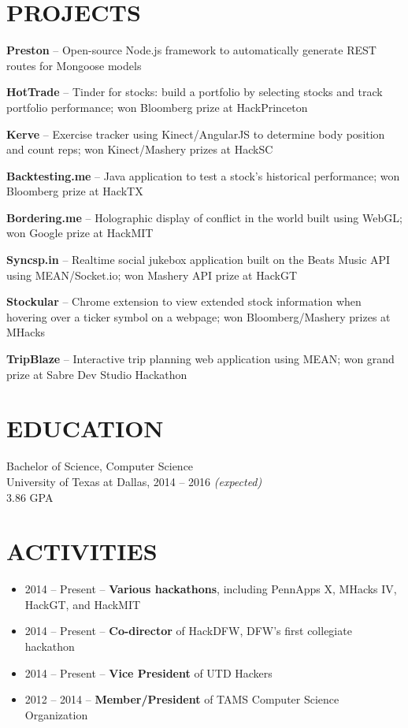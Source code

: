 \documentclass{res} %
\begin{document}
\section{PROJECTS}

\textbf{Preston} -- Open-source Node.js framework to automatically generate REST routes for Mongoose models

\textbf{HotTrade} -- Tinder for stocks: build a portfolio by selecting stocks and track portfolio performance; won Bloomberg prize at HackPrinceton

\textbf{Kerve} -- Exercise tracker using Kinect/AngularJS to determine body position and count reps; won Kinect/Mashery prizes at HackSC

\textbf{Backtesting.me} -- Java application to test a stock's historical performance; won Bloomberg prize at HackTX

\textbf{Bordering.me} -- Holographic display of conflict in the world built using WebGL; won Google prize at HackMIT

\textbf{Syncsp.in} -- Realtime social jukebox application built on the Beats Music API using MEAN/Socket.io; won Mashery API prize at HackGT

\textbf{Stockular} -- Chrome extension to view extended stock information when hovering over a ticker symbol on a webpage; won Bloomberg/Mashery prizes at MHacks

\textbf{TripBlaze} -- Interactive trip planning web application using MEAN; won grand prize at Sabre Dev Studio Hackathon

\section{EDUCATION}

Bachelor of Science, Computer Science \\
University of Texas at Dallas, 2014 -- 2016 \textit {(expected)} \\
3.86 GPA

\section{ACTIVITIES} 

\begin{itemize} \itemsep -2pt
  \item 2014 -- Present -- \textbf{Various hackathons}, including PennApps X, MHacks IV, HackGT, and HackMIT
  \item 2014 -- Present -- \textbf{Co-director} of HackDFW, DFW's first collegiate hackathon
  \item 2014 -- Present -- \textbf{Vice President} of UTD Hackers
  \item 2012 -- 2014 -- \textbf{Member/President} of TAMS Computer Science Organization
\end{itemize}
\end{document}
